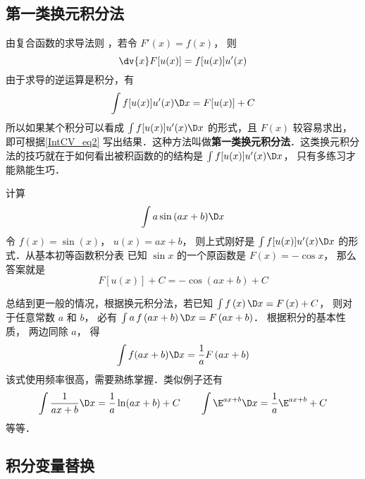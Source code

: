 
\subsection{第一类换元积分法}
由复合函数的求导法则%
，若令 $F'\left( x \right) = f\left( x \right)$， 则
\begin{equation}
\dv{x}	F[u(x)] = f[u(x)]u'(x)
\end{equation}
由于求导的逆运算是积分，有
\begin{equation}\label{IntCV_eq2}
\int f[u(x)]u'(x) \D x  = F[u(x)] + C
\end{equation}
所以如果某个积分可以看成 $\int f[u(x)]u'(x)\D x$ 的形式，且 $F(x)$ 较容易求出，即可根据\autoref{IntCV_eq2} 写出结果．这种方法叫做\textbf{第一类换元积分法}．这类换元积分法的技巧就在于如何看出被积函数的的结构是 $\int f[u(x)]u'(x)\D x$， 只有多练习才能熟能生巧． 

\begin{exam}{}
计算
\begin{equation}
\int {a\sin \left( {ax + b} \right)} \D x
\end{equation}
令 $f\left( x \right) = \sin \left( x \right)$， $u\left( x \right) = ax + b$， 则上式刚好是 $\int f[u(x)]u'(x)\D x$ 的形式．从基本初等函数积分表 %
已知 $\sin x$ 的一个原函数是 $F(x) = -\cos x$， 那么答案就是
\begin{equation}
F[u(x)] + C =  - \cos \left( {ax + b} \right) + C
\end{equation}
\end{exam}

总结到更一般的情况，根据换元积分法，若已知 $\int {f\left( x \right)\D x}  = F\left( x \right) + C$， 则对于任意常数 $a$ 和 $b$， 必有 $\int {a\,f\left( {ax + b} \right)\D x}  = F\left( {ax + b} \right)$． 根据积分的基本性质，%
两边同除 $a$， 得
\begin{equation}
\int {f(ax + b) \D x}  = \frac{1}{a}F\left( {ax + b} \right)
\end{equation}
该式使用频率很高，需要熟练掌握．类似例子还有
\begin{equation}
\int \frac{1}{ax+b}\D x = \frac{1}{a}\ln (ax + b)+C  \qquad
\int \E^{ax + b}\D x = \frac{1}{a}{\E^{ax + b}}+C
\end{equation}
等等．

\subsection{积分变量替换}

